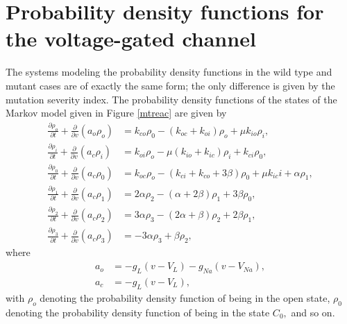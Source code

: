 \section[Probability density functions]{Probability density functions for the
voltage-gated channel}
The systems modeling the probability density functions in the wild type 
and mutant cases are of exactly the same form; the only difference is
given by the mutation severity index. 
The probability density functions of the states of the Markov model given in
Figure \ref{mtreac} are given by%
\begin{align}
\frac{\partial\rho_{o}}{\partial t}+\frac{\partial}{\partial v}\left(
a_{o}\rho_{o}\right)   &  =k_{co}\rho_{0}-\left(  k_{oc}+k_{oi}\right)
\rho_{o}+\mu k_{io}\rho_{i},\nonumber\\
\frac{\partial\rho_{i}}{\partial t}+\frac{\partial}{\partial v}\left(
a_{c}\rho_{i}\right)   &  =k_{oi}\rho_{o}-\mu\left(  k_{io}+k_{ic}\right)
\rho_{i}+k_{ci}\rho_{0},\nonumber\\
\frac{\partial\rho_{0}}{\partial t}+\frac{\partial}{\partial v}\left(
a_{c}\rho_{0}\right)   &  =k_{oc}\rho_{o}-\left(  k_{ci}+k_{co}+3\beta\right)
\rho_{0}+\mu k_{ic}i +\alpha \rho_{1} ,\label{vgpdf}\\
\frac{\partial\rho_{1}}{\partial t}+\frac{\partial}{\partial v}\left(
a_{c}\rho_{1}\right)   &  =2\alpha\rho_{2}-\left(  \alpha+2\beta\right)
\rho_{1}+3\beta\rho_{0},\nonumber\\
\frac{\partial\rho_{2}}{\partial t}+\frac{\partial}{\partial v}\left(
a_{c}\rho_{2}\right)   &  =3\alpha\rho_{3}-\left(  2\alpha+\beta\right)
\rho_{2}+2\beta\rho_{1},\nonumber\\
\frac{\partial\rho_{3}}{\partial t}+\frac{\partial}{\partial v}\left(
a_{c}\rho_{3}\right)   &  =-3\alpha\rho_{3}+\beta\rho_{2},\nonumber
\end{align}
where
\begin{align}
a_{o} &  =-g_{L}\left(  v-V_{L}\right)  -g_{Na}(v-V_{Na}),\label{sflux}\\
a_{c} &  =-g_{L}\left(  v-V_{L}\right)  ,\nonumber
\end{align}
with $\rho_{o}$ denoting the probability density function of being in the open
state, $\rho_{0}$ denoting the probability density function of being in the
state $C_{0},$ and so on.


